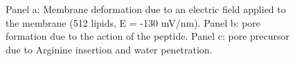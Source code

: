 \begin{figure}[t]
\centering
\begin{minipage}[b]{0.26\linewidth}
\centering
{}
\end{minipage}
\begin{minipage}[b]{0.4\linewidth}
\centering
{}
\end{minipage}
\begin{minipage}[b]{0.26\linewidth}
\centering
{}
\end{minipage}
\caption{Panel a: Membrane deformation due to an electric field applied to the membrane (512 lipids, E = -130 mV/nm). Panel b: pore formation due to the action of the peptide. Panel c: pore precursor due to Arginine insertion and water penetration.}
\label{fig:pore_pics}
\end{figure}

